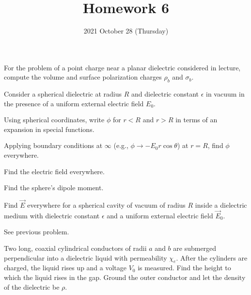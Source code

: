 \documentclass{phys151}
\title{Homework 6}
\date{2021 October 28 (Thursday)}
\author{}
\begin{document}
\begin{problem}
  For the problem of a point charge near a planar dielectric considered in
  lecture, compute the volume and surface polarization charges \(\rho_b\) and
  \(\sigma_b\).
\end{problem}

\begin{solution}

\end{solution}

\begin{problem}
  Consider a spherical dielectric at radius \(R\) and dielectric constant
  \(\epsilon\) in vacuum in the presence of a uniform external electric field
  \(E_0\).
  \begin{subproblems}
  \item Using spherical coordinates, write \(\phi\) for \(r<R\) and \(r>R\)
    in terms of an expansion in special functions.
  \item Applying boundary conditions at \(\infty\) (e.g., \(\phi \to -E_0 r
    \cos \theta\)) at \(r=R\), find \(\phi\) everywhere.
  \item Find the electric field everywhere.
  \item Find the sphere's dipole moment.
  \end{subproblems}
\end{problem}

\begin{solution}

\end{solution}

\begin{problem}
  Find \(\vec E\) everywhere for a spherical cavity of vacuum of radius \(R\)
  inside a dielectric medium with dielectric constant \(\epsilon\) and a
  uniform external electric field \(\vec E_0\).
  \begin{hint}
    See previous problem.
  \end{hint}
\end{problem}

\begin{solution}

\end{solution}

\begin{problem}
  Two long, coaxial cylindrical conductors of radii \(a\) and \(b\) are
  submerged perpendicular into a dielectric liquid with permeability
  \(\chi_e\).  After the cylinders are charged, the liquid rises up and a
  voltage \(V_0\) is measured.  Find the height to which the liquid rises in
  the gap.  Ground the outer conductor and let the density of the dielectric be
  \(\rho\).
\end{problem}

\begin{solution}

\end{solution}
\end{document}
